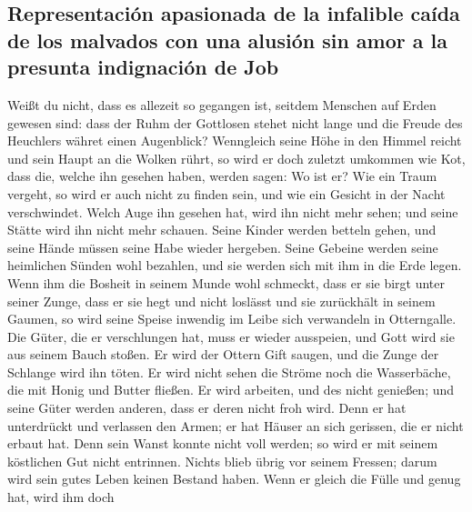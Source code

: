 \hypertarget{representaciuxf3n-apasionada-de-la-infalible-cauxedda-de-los-malvados-con-una-alusiuxf3n-sin-amor-a-la-presunta-indignaciuxf3n-de-job}{%
\subsection{Representación apasionada de la infalible caída de los
malvados con una alusión sin amor a la presunta indignación de
Job}\label{representaciuxf3n-apasionada-de-la-infalible-cauxedda-de-los-malvados-con-una-alusiuxf3n-sin-amor-a-la-presunta-indignaciuxf3n-de-job}}

 Weißt du nicht, dass es allezeit so gegangen ist, seitdem
Menschen auf Erden gewesen sind:  dass der Ruhm der
Gottlosen stehet nicht lange und die Freude des Heuchlers währet einen
Augenblick?  Wenngleich seine Höhe in den Himmel reicht
und sein Haupt an die Wolken rührt,  so wird er doch
zuletzt umkommen wie Kot, dass die, welche ihn gesehen haben, werden
sagen: Wo ist er?  Wie ein Traum vergeht, so wird er auch
nicht zu finden sein, und wie ein Gesicht in der Nacht verschwindet.
 Welch Auge ihn gesehen hat, wird ihn nicht mehr sehen;
und seine Stätte wird ihn nicht mehr schauen.  Seine
Kinder werden betteln gehen, und seine Hände müssen seine Habe wieder
hergeben.  Seine Gebeine werden seine heimlichen Sünden
wohl bezahlen, und sie werden sich mit ihm in die Erde legen.
 Wenn ihm die Bosheit in seinem Munde wohl schmeckt, dass
er sie birgt unter seiner Zunge,  dass er sie hegt und
nicht loslässt und sie zurückhält in seinem Gaumen,  so
wird seine Speise inwendig im Leibe sich verwandeln in Otterngalle.
 Die Güter, die er verschlungen hat, muss er wieder
ausspeien, und Gott wird sie aus seinem Bauch stoßen.  Er
wird der Ottern Gift saugen, und die Zunge der Schlange wird ihn töten.
 Er wird nicht sehen die Ströme noch die Wasserbäche, die
mit Honig und Butter fließen.  Er wird arbeiten, und des
nicht genießen; und seine Güter werden anderen, dass er deren nicht froh
wird.  Denn er hat unterdrückt und verlassen den Armen;
er hat Häuser an sich gerissen, die er nicht erbaut hat. 
Denn sein Wanst konnte nicht voll werden; so wird er mit seinem
köstlichen Gut nicht entrinnen.  Nichts blieb übrig vor
seinem Fressen; darum wird sein gutes Leben keinen Bestand haben.
 Wenn er gleich die Fülle und genug hat, wird ihm doch
